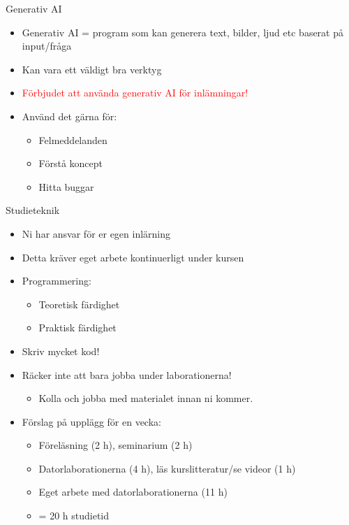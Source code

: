 \documentclass[
  10pt,
  ignorenonframetext,
]{beamer}
\providecommand{\tightlist}{%
  \setlength{\itemsep}{0pt}\setlength{\parskip}{0pt}}
\begin{document}
\begin{frame}{Generativ AI}
\protect\hypertarget{Generativ AI}{}
\begin{itemize}
\tightlist
\item
  Generativ AI = program som kan generera text, bilder, ljud etc baserat på input/fråga
\item
  Kan vara ett väldigt bra verktyg
\item
  \textcolor{red}{Förbjudet att använda generativ AI för inlämningar!}
\item
  Använd det gärna för:

  \begin{itemize}
  \tightlist
  \item
    Felmeddelanden
  \item
    Förstå koncept
  \item
    Hitta buggar
  \end{itemize}
\end{itemize}
\end{frame}

\begin{frame}{Studieteknik}
\protect\hypertarget{studieteknik}{}
\begin{itemize}
\tightlist
\item
  Ni har ansvar för er egen inlärning
\item
  Detta kräver eget arbete kontinuerligt under kursen
\item
  Programmering:

  \begin{itemize}
  \tightlist
  \item
    Teoretisk färdighet
  \item
    Praktisk färdighet
  \end{itemize}
\item
  Skriv mycket kod!
\item
  Räcker inte att bara jobba under laborationerna!

  \begin{itemize}
  \tightlist
  \item
    Kolla och jobba med materialet innan ni kommer.
  \end{itemize}
\item
  Förslag på upplägg för en vecka:
  \begin{itemize}
  \tightlist
  \item
    Föreläsning (2 h), seminarium (2 h)
  \item
    Datorlaborationerna (4 h), läs kurslitteratur/se videor (1 h)
  \item
    Eget arbete med datorlaborationerna (11 h)
  \item
    = 20 h studietid
  \end{itemize}
  
\end{itemize}
\end{frame}
\end{document}

